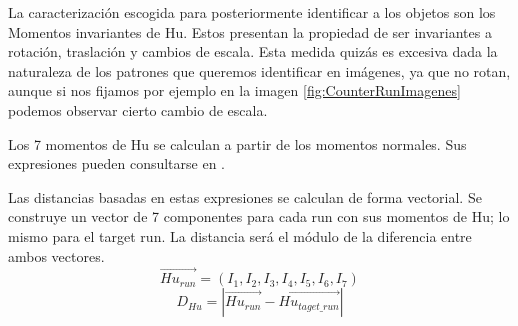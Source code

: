 La caracterización escogida para posteriormente identificar a los objetos son los
Momentos invariantes de Hu. Estos presentan la propiedad de ser invariantes a
rotación, traslación y cambios de escala. Esta medida quizás es excesiva dada la 
naturaleza de los patrones que queremos identificar en imágenes, ya que no rotan,
aunque si nos fijamos por ejemplo en la imagen \ref{fig:CounterRunImagenes}
podemos observar cierto cambio de escala.

Los 7 momentos de Hu se calculan a partir de los momentos normales. Sus
expresiones pueden consultarse en \cite{Hu}.

Las distancias basadas en estas expresiones se calculan de forma vectorial. Se
construye un vector de 7 componentes para cada run con sus momentos de Hu; lo
mismo para el target run. La distancia será el módulo de la diferencia entre ambos
vectores.
\begin{equation}
    \label{eq:VectorHu}
    \overrightarrow{Hu_{run}} = (I_1, I_2, I_3, I_4, I_5, I_6, I_7)
\end{equation}
\begin{equation}
    \label{eq:HuDist}
    D_{Hu} = |\overrightarrow{Hu_{run}} - \overrightarrow{Hu_{taget\_run}}|
\end{equation}

